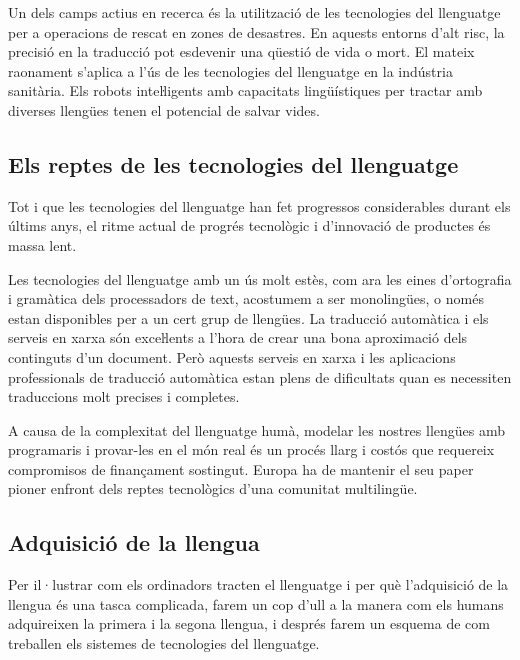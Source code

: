 \begin{multicols}{2}

Un dels camps actius en recerca és la utilització de les tecnologies del llenguatge per a operacions de rescat en zones de desastres. En aquests entorns d’alt risc, la precisió en la traducció pot esdevenir una qüestió de vida o mort. El mateix raonament s’aplica a l’ús de les tecnologies del llenguatge en la indústria sanitària. Els robots inteŀligents amb capacitats lingüístiques per tractar amb diverses llengües tenen el potencial de salvar vides. 

\subsection{Els reptes de les tecnologies del llenguatge}

Tot i que les tecnologies del llenguatge han fet progressos considerables durant els últims anys, el ritme actual de progrés tecnològic i d’innovació de productes és massa lent.


Les tecnologies del llenguatge amb un ús molt estès, com ara les eines d’ortografia i gramàtica dels processadors de text, acostumem a ser monolingües, o només estan disponibles per a un cert grup de llengües. La traducció automàtica i els serveis en xarxa són exceŀlents a l’hora de crear una bona aproximació dels continguts d’un document. Però aquests serveis en xarxa i les aplicacions professionals de traducció automàtica estan plens de dificultats quan es necessiten traduccions molt precises i completes. 

A causa de la complexitat del llenguatge humà, modelar les nostres llengües amb programaris i provar-les en el món real és un procés llarg i costós que requereix compromisos de finançament sostingut. Europa ha de mantenir el seu paper pioner enfront dels reptes tecnològics d'una comunitat multilingüe.


\subsection{Adquisició de la llengua}

Per il·lustrar com els ordinadors tracten el llenguatge i per què l’adquisició de la llengua és una tasca complicada, farem un cop d’ull a la manera com els humans adquireixen la primera i la segona llengua, i després farem un esquema de com treballen els sistemes de tecnologies del llenguatge.


\end{multicols}
